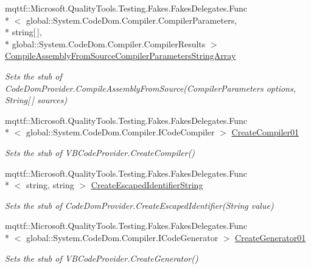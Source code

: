 \begin{DoxyCompactItemize}
mqttf\-::\-Microsoft.\-Quality\-Tools.\-Testing.\-Fakes.\-Fakes\-Delegates.\-Func\\*
$<$ global\-::\-System.\-Code\-Dom.\-Compiler.\-Compiler\-Parameters, \\*
string\mbox{[}$\,$\mbox{]}, \\*
global\-::\-System.\-Code\-Dom.\-Compiler.\-Compiler\-Results $>$ \hyperlink{class_microsoft_1_1_visual_basic_1_1_fakes_1_1_stub_v_b_code_provider_addcc4668a0e9e01fa8762c0438bc9458}{Compile\-Assembly\-From\-Source\-Compiler\-Parameters\-String\-Array}
\begin{DoxyCompactList}\small\item\em Sets the stub of Code\-Dom\-Provider.\-Compile\-Assembly\-From\-Source(\-Compiler\-Parameters options, String\mbox{[}$\,$\mbox{]} sources)\end{DoxyCompactList}\item 
mqttf\-::\-Microsoft.\-Quality\-Tools.\-Testing.\-Fakes.\-Fakes\-Delegates.\-Func\\*
$<$ global\-::\-System.\-Code\-Dom.\-Compiler.\-I\-Code\-Compiler $>$ \hyperlink{class_microsoft_1_1_visual_basic_1_1_fakes_1_1_stub_v_b_code_provider_abec2d63453b9f6004c87538c9e971286}{Create\-Compiler01}
\begin{DoxyCompactList}\small\item\em Sets the stub of V\-B\-Code\-Provider.\-Create\-Compiler()\end{DoxyCompactList}\item 
mqttf\-::\-Microsoft.\-Quality\-Tools.\-Testing.\-Fakes.\-Fakes\-Delegates.\-Func\\*
$<$ string, string $>$ \hyperlink{class_microsoft_1_1_visual_basic_1_1_fakes_1_1_stub_v_b_code_provider_ab7b1d8e3c87b31a204441b0818ee4405}{Create\-Escaped\-Identifier\-String}
\begin{DoxyCompactList}\small\item\em Sets the stub of Code\-Dom\-Provider.\-Create\-Escaped\-Identifier(\-String value)\end{DoxyCompactList}\item 
mqttf\-::\-Microsoft.\-Quality\-Tools.\-Testing.\-Fakes.\-Fakes\-Delegates.\-Func\\*
$<$ global\-::\-System.\-Code\-Dom.\-Compiler.\-I\-Code\-Generator $>$ \hyperlink{class_microsoft_1_1_visual_basic_1_1_fakes_1_1_stub_v_b_code_provider_a7e800fea431216095a95067e5f029153}{Create\-Generator01}
\begin{DoxyCompactList}\small\item\em Sets the stub of V\-B\-Code\-Provider.\-Create\-Generator()\end{DoxyCompactList}\item 

\end{DoxyCompactItemize}
